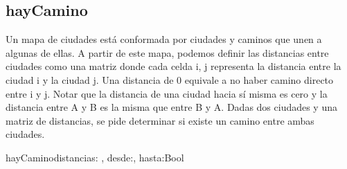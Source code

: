 \documentclass[10pt,a4paper]{article}
\begin{document}
\subsection {hayCamino}
 Un mapa de ciudades está conformada por ciudades y caminos que unen a algunas de ellas. A partir de
este mapa, podemos definir las distancias entre ciudades como una matriz donde cada celda i, j representa la distancia
entre la ciudad i y la ciudad j. Una distancia de 0 equivale a no haber camino directo entre i y j. Notar que
la distancia de una ciudad hacia sí misma es cero y la distancia entre A y B es la misma que entre B y A.
Dadas dos ciudades y una matriz de distancias, se pide determinar si existe un camino entre ambas ciudades.
\vspace{0.2cm}
\begin{proc}{hayCamino}{\In distancias: \TLista{\TLista{\ent}}, \In desde:\ent , \In hasta:\ent }{Bool}

	
\vspace{0.2cm}
	
\end{proc}
\vspace{0.2cm}
\end{document}
